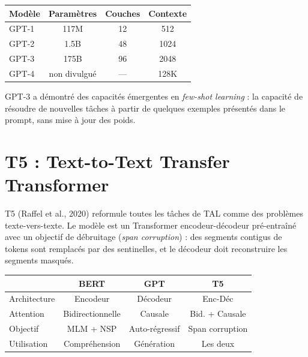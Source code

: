 \begin{center}
\begin{tabular}{lccc}
\toprule
\textbf{Mod\`ele} & \textbf{Param\`etres} & \textbf{Couches} & \textbf{Contexte} \\
\midrule
GPT-1 & 117M & 12 & 512 \\
GPT-2 & 1.5B & 48 & 1024 \\
GPT-3 & 175B & 96 & 2048 \\
GPT-4 & non divulgu\'e & --- & 128K \\
\bottomrule
\end{tabular}
\end{center}

\begin{remarque}
GPT-3 a d\'emontr\'e des capacit\'es \'emergentes en \emph{few-shot learning} :
la capacit\'e de r\'esoudre de nouvelles t\^aches \`a partir de quelques
exemples pr\'esent\'es dans le prompt, sans mise \`a jour des poids.
\end{remarque}

\section{T5 : Text-to-Text Transfer Transformer}
\label{sec:pre:t5}

\begin{definition}[T5]
T5 (Raffel et al., 2020) reformule toutes les t\^aches de TAL comme des
probl\`emes texte-vers-texte. Le mod\`ele est un Transformer encodeur-d\'ecodeur
pr\'e-entra\^in\'e avec un objectif de d\'ebruitage (\emph{span corruption}) :
des segments contigus de tokens sont remplac\'es par des sentinelles, et le
d\'ecodeur doit reconstruire les segments masqu\'es.
\end{definition}

\begin{formules}[title=\textbf{Comparaison des architectures}]
\begin{center}
\begin{tabular}{lccc}
\toprule
& \textbf{BERT} & \textbf{GPT} & \textbf{T5} \\
\midrule
Architecture & Encodeur & D\'ecodeur & Enc-D\'ec \\
Attention & Bidirectionnelle & Causale & Bid. + Causale \\
Objectif & MLM + NSP & Auto-r\'egressif & Span corruption \\
Utilisation & Compr\'ehension & G\'en\'eration & Les deux \\
\bottomrule
\end{tabular}
\end{center}
\end{formules}

